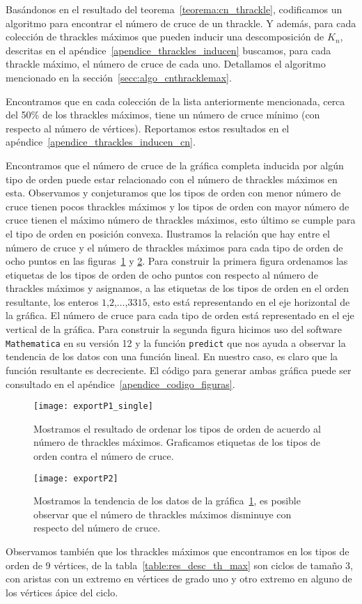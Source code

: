     Basándonos en el resultado del teorema~\ref{teorema:cn_thrackle}, codificamos un
    algoritmo para encontrar el número de cruce de un thrackle. Y además, para cada colección de
    thrackles máximos que pueden inducir una descomposición de $K_n$, descritas en el
    apéndice~\ref{apendice_thrackles_inducen} buscamos, para cada thrackle máximo, el número
    de cruce de cada uno. Detallamos el algoritmo mencionado en la
    sección~\ref{secc:algo_cnthracklemax}.

    Encontramos que en cada colección de la lista anteriormente mencionada, cerca del 50\% de los
    thrackles máximos, tiene un número de cruce mínimo (con respecto al número de vértices).
    Reportamos estos resultados en el apéndice~\ref{apendice_thrackles_inducen_cn}.

    Encontramos que el número de cruce de la gráfica completa inducida por algún tipo de orden
    puede estar relacionado con el número de thrackles máximos en esta. Observamos y conjeturamos
    que los tipos de orden con menor número de cruce tienen pocos thrackles máximos y los tipos de
    orden con mayor número de cruce tienen el máximo número de thrackles máximos, esto último se
    cumple para el tipo de orden en posición convexa. Ilustramos la relación
    que hay entre el número de cruce y el número de thrackles máximos para cada tipo de orden de
    ocho puntos en las figuras~\ref{fig:cnk8} y \ref{fig:cnk8_2}. Para construir la primera figura
    ordenamos las etiquetas de los tipos de orden de ocho puntos con respecto al número de thrackles
    máximos y asignamos, a las etiquetas de los tipos de orden en el orden resultante, los enteros
    $1$,$2$,$\dots$,$3315$, esto está representando en el eje horizontal de la gráfica. El número de
    cruce para cada tipo de orden está representado en el eje vertical de la gráfica. Para construir
    la segunda figura hicimos uso del software \texttt{Mathematica} en su versión 12 y la función
    \texttt{predict} que nos ayuda a observar la tendencia de los datos con una función lineal. En nuestro caso, es claro que la función resultante es decreciente. El código para generar ambas gráfica puede ser consultado en el apéndice~\ref{apendice_codigo_figuras}.
    \begin{figure}
      \centering
      \texttt{[image: exportP1\_single]}
      \caption{Mostramos el resultado de ordenar los tipos de orden de acuerdo al número de thrackles máximos. Graficamos etiquetas de los tipos de orden contra el número de cruce.}
      \label{fig:cnk8}
    \end{figure}
    \begin{figure}
      \centering
      \texttt{[image: exportP2]}
      \caption{Mostramos la tendencia de los datos de la gráfica~\ref{fig:cnk8}, es posible observar que el número de thrackles máximos disminuye con respecto del número de cruce.}
      \label{fig:cnk8_2}
    \end{figure}
    Observamos también que los thrackles máximos que encontramos en los tipos de orden de 9
    vértices, de la tabla~\ref{table:res_desc_th_max} son ciclos de tamaño 3, con aristas con un
    extremo en vértices de grado uno y otro extremo en alguno de los vértices ápice del ciclo.

